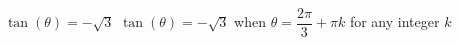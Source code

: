 {$\tan(\theta) = -\sqrt{3}$}
{$\tan(\theta) = -\sqrt{3}$ when $\theta = \dfrac{2\pi}{3} + \pi k$ for any integer $k$}
